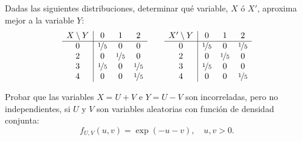 \begin{ejercicio}
    Dadas las siguientes distribuciones, determinar qué variable, $X$ ó $X'$, aproxima mejor a la variable $Y$:
    \begin{equation*}
        \begin{array}{c|ccc}
            X\setminus Y & 0 & 1 & 2\\
            \hline
            0 & \nicefrac{1}{5} & 0 & 0\\
            2 & 0 & \nicefrac{1}{5} & 0\\
            3 & \nicefrac{1}{5} & 0 & \nicefrac{1}{5}\\
            4 & 0 & 0 & \nicefrac{1}{5}
        \end{array}
        \qquad
        \begin{array}{c|ccc}
            X'\setminus Y & 0 & 1 & 2\\
            \hline
            0 & \nicefrac{1}{5} & 0 & \nicefrac{1}{5}\\
            2 & 0 & \nicefrac{1}{5} & 0\\
            3 & \nicefrac{1}{5} & 0 & 0\\
            4 & 0 & 0 & \nicefrac{1}{5}
        \end{array}
    \end{equation*}
\end{ejercicio}

\begin{ejercicio} \label{ej:4.7}
    Probar que las variables $X = U + V$ e $Y = U - V$ son incorreladas, pero no independientes, si $U$ y $V$ son variables aleatorias con función de densidad conjunta:
    \begin{equation*}
        f_{U,V}(u, v) = \exp(-u-v), \quad u, v > 0.
    \end{equation*}
\end{ejercicio}

